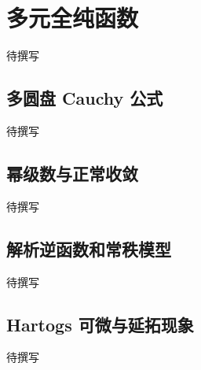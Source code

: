 
% 
% 

\section{多元全纯函数}
\label{g4:sec:1401}

待撰写

\subsection{多圆盘 Cauchy 公式}
\label{g4:subsec:1401:01}
待撰写

\subsection{幂级数与正常收敛}
\label{g4:subsec:1401:02}
待撰写

\subsection{解析逆函数和常秩模型}
\label{g4:subsec:1401:03}
待撰写

\subsection{Hartogs 可微与延拓现象}
\label{g4:subsec:1401:04}
待撰写
